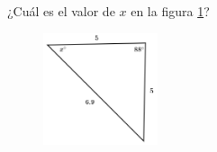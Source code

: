 \question[15]  ¿Cuál es el valor de $x$ en la figura \ref{fig:findangle12}?
\begin{figure}[H]
    \begin{center}
        \includegraphics[width=0.3\textwidth]{../images/findangle12.png}
    \end{center}
    \caption{}
    \label{fig:findangle12}
\end{figure}
